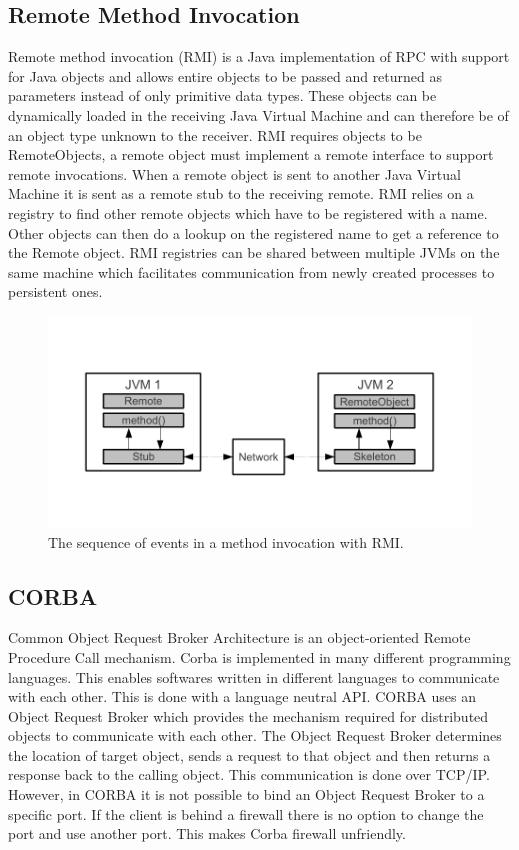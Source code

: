 \subsection{Remote Method Invocation}
Remote method invocation (RMI) is a Java implementation of RPC with support for Java objects and allows entire objects to be passed and returned as parameters instead of only primitive data types. These objects can be dynamically loaded in the receiving Java Virtual Machine and can therefore be of an object type unknown to the receiver. RMI requires objects to be RemoteObjects, a remote object must implement a remote interface to support remote invocations. When a remote object is sent to another Java Virtual Machine it is sent as a remote stub to the receiving remote.
RMI relies on a registry to find other remote objects which have to be registered with a name. Other objects can then do a lookup on the registered name to get a reference to the Remote object. RMI registries can be shared between multiple JVMs on the same machine which facilitates communication from newly created processes to persistent ones.

\begin{figure}[H]
	\centering
    	\includegraphics{part_2/remote_procedure_calls/rmi.pdf}
		\caption{The sequence of events in a method invocation with RMI.}
		\label{rmi} 
\end{figure}

\subsection{CORBA}
Common Object Request Broker Architecture is an object-oriented Remote Procedure Call mechanism. Corba is implemented in many different programming languages. This enables softwares written in different languages to communicate with each other. This is done with a language neutral API. CORBA uses an Object Request Broker which provides the mechanism required for distributed objects to communicate with each other. The Object Request Broker determines the location of target object, sends a request to that object and then returns a response back to the calling object. This communication is done over TCP/IP. However, in CORBA it is not possible to bind an Object Request Broker to a specific port. If the client is behind a firewall there is no option to change the port and use another port. This makes Corba firewall unfriendly.
